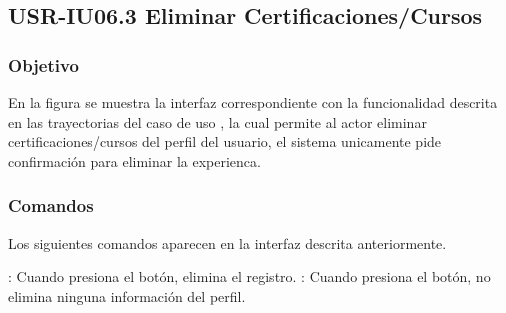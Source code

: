 \clearpage
\subsection{USR-IU06.3 Eliminar Certificaciones/Cursos}

\subsubsection{Objetivo}
En la figura  se muestra la interfaz correspondiente con la funcionalidad descrita en las
trayectorias del caso de uso  , la cual permite al actor eliminar  certificaciones/cursos del perfil del usuario, el sistema unicamente pide confirmación para eliminar la experienca.

\subsubsection{Comandos}
Los siguientes comandos aparecen en la interfaz descrita anteriormente.

\Titem {} : Cuando presiona el botón, elimina el registro.
\Titem {} : Cuando presiona el botón, no elimina ninguna información del perfil.%



\clearpage
